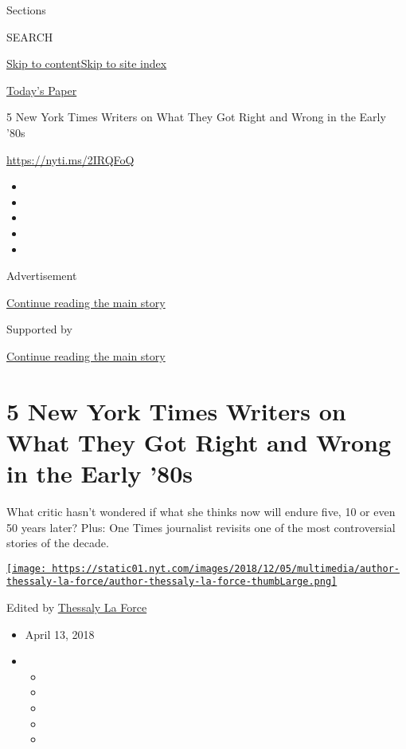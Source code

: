Sections

SEARCH

\protect\hyperlink{site-content}{Skip to
content}\protect\hyperlink{site-index}{Skip to site index}

\href{https://myaccount.nytimes.com/auth/login?response_type=cookie\&client_id=vi}{}

\href{https://www.nytimes.com/section/todayspaper}{Today's Paper}

5 New York Times Writers on What They Got Right and Wrong in the Early
'80s

\href{https://nyti.ms/2IRQFoQ}{https://nyti.ms/2IRQFoQ}

\begin{itemize}
\item
\item
\item
\item
\item
\end{itemize}

Advertisement

\protect\hyperlink{after-top}{Continue reading the main story}

Supported by

\protect\hyperlink{after-sponsor}{Continue reading the main story}

\hypertarget{5-new-york-times-writers-on-what-they-got-right-and-wrong-in-the-early-80s}{%
\section{5 New York Times Writers on What They Got Right and Wrong in
the Early
'80s}\label{5-new-york-times-writers-on-what-they-got-right-and-wrong-in-the-early-80s}}

What critic hasn't wondered if what she thinks now will endure five, 10
or even 50 years later? Plus: One Times journalist revisits one of the
most controversial stories of the decade.

\href{https://www.nytimes.com/by/thessaly-la-force}{\texttt{[image: https://static01.nyt.com/images/2018/12/05/multimedia/author-thessaly-la-force/author-thessaly-la-force-thumbLarge.png]}}

Edited by \href{https://www.nytimes.com/by/thessaly-la-force}{Thessaly
La Force}

\begin{itemize}
\item
  April 13, 2018
\item
  \begin{itemize}
  \item
  \item
  \item
  \item
  \item
  \end{itemize}
\end{itemize}

